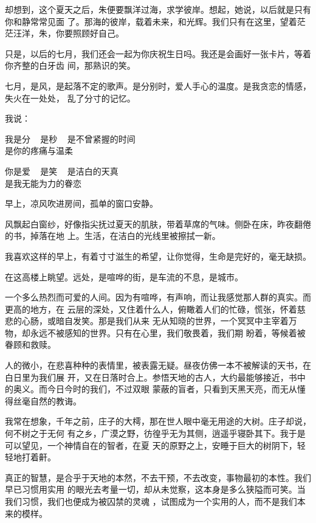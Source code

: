 \documentclass[12pt,a4paper]{article}
\begin{document}
		却想到，这个夏天之后，朱便要飘洋过海，求学彼岸。想起，她说，以后就是只有你和静常常见面
	了。那海的彼岸，载着未来，和光辉。我们只有在这里，望着茫茫汪洋，朱，你要照顾好自己。

		只是，以后的七月，我们还会一起为你庆祝生日吗。我还是会画好一张卡片，等着你齐整的白牙齿
	间，那熟识的笑。


		七月，是风，是起落不定的歌声。是分别时，爱人手心的温度。是我贪恋的情感，失火在一处处，
	乱了分寸的记忆。


		我说：

		\longpoem{}{}{}

		我是分 ~ 是秒 ~ 是不曾紧握的时间 \\
		是你的疼痛与温柔


		你是爱 ~ 是笑 ~ 是洁白的天真 \\
		是我无能为力的眷恋
		\endlongpoem

	\endwriting



		早上，凉风吹进房间，孤单的窗口安静。

		风飘起白窗纱，好像指尖抚过夏天的肌肤，带着草席的气味。侧卧在床，昨夜翻倦的书，掉落在地
	上。生活，在洁白的光线里被擦拭一新。

		我喜欢这样的早上，有着寸寸滋生的希望，让你觉得，生命是完好的，毫无缺损。

		在这高楼上眺望。远处，是喧哗的街，是车流的不息，是城市。

		一个多么热烈而可爱的人间。因为有喧哗，有声响，而让我感觉那人群的真实。而更高的地方，在
	云层的深处，又住着什么人，俯瞰着人们的忙碌，慌张，怀着慈悲的心肠，或暗自发笑。那是我们从来
	无从知晓的世界，一个冥冥中主宰着万物，却永远不被感知的世界。只有在心里，我们敬畏着，我们期
	盼着，等候着被眷顾和救赎。

		人的微小，在悲喜种种的表情里，被表露无疑。昼夜仿佛一本不被解读的天书，在白日里为我们展
	开，又在日落时合上。参悟天地的古人，大约最能够接近，书中的奥义。而今日今时的我们，不过双眼
	蒙蔽的盲者，只看到天黑天亮，而无从懂得丝毫自然的教诲。

		我常在想象，千年之前，庄子的大樗，那在世人眼中毫无用途的大树。庄子却说，何不树之于无何
	有之乡，广漠之野，彷徨乎无为其侧，逍遥乎寝卧其下。我于是可以望见，一个神情自在的智者，在夏
	天的原野之上，安睡于巨大的树阴下，轻轻地打着鼾。

		真正的智慧，是合乎于天地的本然，不去干预，不去改变，事物最初的本性。我们早已习惯用实用
	的眼光去考量一切，却从未觉察，这本身是多么狭隘而可笑。当我们习惯，我们也便成为被囚禁的灵魂
	，试图成为一个实用的人，而不是我们本来的模样。
\end{document}
